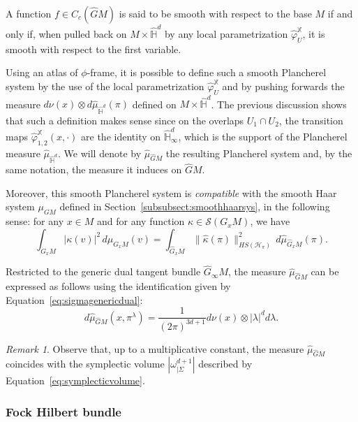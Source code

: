 \documentclass[12pt,a4paper]{amsart}
\theoremstyle{plain}
\theoremstyle{definition}
\theoremstyle{remark}
\newtheorem{remark}[theorem]{Remark}
\numberwithin{equation}{section}
\theoremstyle{definition}
\def \bX{\mathbb{X}}
\def \Heis{\mathbb{H}}
\def \Ghat{\widehat{G}}
\def \Hhat{\widehat{\Heis}}
\numberwithin{equation}{section}
\begin{document}
A function $f\in C_c(\Ghat M)$ is said to be smooth with respect to the base $M$ if and only if, when pulled back on $M\times \Hhat^d$ by any local parametrization $\hat{\varphi}_U^\bX$, it is smooth with respect to the first variable.

Using an atlas of $\phi$-frame, it is possible to define such a smooth Plancherel system by the use of the local parametrization $\hat{\varphi}_U^\bX$ and by pushing forwards the measure $d\nu(x)\otimes d\hat{\mu}_{\Hhat^d}(\pi)$ defined on $M\times \Hhat^d$. The previous discussion shows that such a definition makes sense since on the overlaps $U_1\cap U_2$, the transition maps $\hat{\varphi}_{1,2}^\bX(x,\cdot)$ are the identity on $\Hhat^d_\infty$, which is the support of the Plancherel measure $\hat{\mu}_{\Hhat^d}$. We will denote by $\hat{\mu}_{\Ghat M}$ the resulting Plancherel system and, by the same notation, the measure it induces on $\Ghat M$.

Moreover, this smooth Plancherel system is \emph{compatible} with the smooth Haar system $\mu_{GM}$ defined in Section~\ref{subsubsect:smoothhaarsys}, in the following sense: for any $x\in M$ and for any function $\kappa \in \mathcal{S}(G_x M)$, we have
\begin{equation}
    \label{eq:compatiblesystems}
    \int_{G_x M} |\kappa(v)|^2\,d\mu_{G_x M}(v) = \int_{\Ghat_x M} \|\hat{\kappa}(\pi)\|_{HS(\mathcal{H}_\pi)}^2\,d\hat{\mu}_{\Ghat_x M}(\pi).
\end{equation}

Restricted to the generic dual tangent bundle $\Ghat_\infty M$, the measure $\hat{\mu}_{\Ghat M}$ can be expressed as follows using the identification given by Equation~\eqref{eq:sigmagenericdual}:
\begin{equation*}
    d\hat{\mu}_{\Ghat M}(x,\pi^\lambda) = \frac{1}{(2\pi)^{3d+1}} d\nu(x)\otimes |\lambda|^dd\lambda.
\end{equation*}

\begin{remark}
    Observe that, up to a multiplicative constant, the measure $\hat{\mu}_{\Ghat M}$ coincides with the symplectic volume $|\omega_{|\Sigma}^{d+1}|$ described by Equation~\eqref{eq:symplecticvolume}.
\end{remark}


\subsubsection{Fock Hilbert bundle} 
\end{document}
